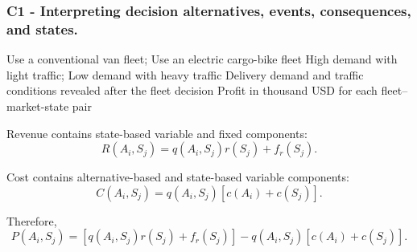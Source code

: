 	\subsubsection*{C1 - Interpreting decision alternatives, events, consequences, and states.}
	\label{subsec:problem13-urban-delivery-fleet-c1}

	\DecisionElementsTable
	{Use a conventional van fleet; Use an electric cargo-bike fleet}
	{High demand with light traffic; Low demand with heavy traffic}
	{Delivery demand and traffic conditions revealed after the fleet decision}
	{Profit in thousand USD for each fleet--market-state pair}

	Revenue contains state-based variable and fixed components:
	\[
	R(A_i,S_j)
	=
	q(A_i,S_j)r(S_j)+f_r(S_j).
	\]

	Cost contains alternative-based and state-based variable components:
	\[
	C(A_i,S_j)
	=
	q(A_i,S_j)
	\left[
	c(A_i)+c(S_j)
	\right].
	\]

	Therefore,
	\[
	P(A_i,S_j)
	=
	\left[
	q(A_i,S_j)r(S_j)+f_r(S_j)
	\right]
	-
	q(A_i,S_j)
	\left[
	c(A_i)+c(S_j)
	\right].
	\]


